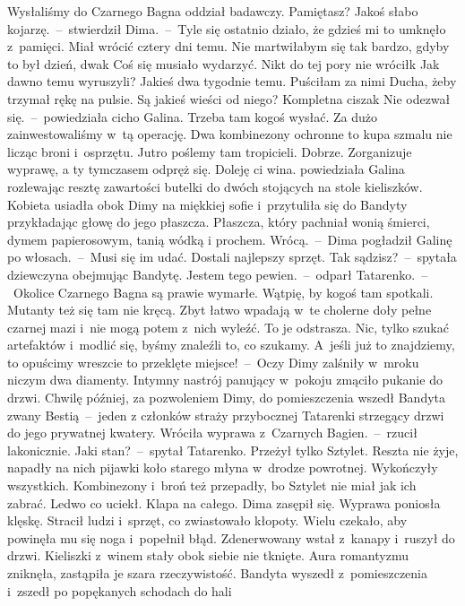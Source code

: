 \documentclass[../MAIN.tex]{subfiles}
\begin{document}
\xx  Wysłaliśmy do Czarnego Bagna oddział badawczy. Pamiętasz?
\xx  Jakoś słabo kojarzę.~--~stwierdził Dima.~--~Tyle się ostatnio działo, że
gdzieś mi to umknęło z~pamięci.
\xx  Miał wrócić cztery dni temu. Nie martwiłabym się tak bardzo, gdyby to był
dzień, dwa\3k Coś się musiało wydarzyć. Nikt do tej pory nie wrócił\3k
\xx  Jak dawno temu wyruszyli?
\xx  Jakieś dwa tygodnie temu. Puściłam za nimi Ducha, żeby trzymał rękę na
pulsie.
\xx  Są jakieś wieści od niego?
\xx  Kompletna cisza\3k Nie odezwał się.~--~powiedziała cicho Galina.
\xx  Trzeba tam kogoś wysłać. Za dużo zainwestowaliśmy w~tą operację. Dwa
kombinezony ochronne to kupa szmalu nie licząc broni i~osprzętu. Jutro poślemy
tam tropicieli.
\xx  Dobrze. Zorganizuje wyprawę, a ty tymczasem odpręż się. Doleję ci wina. \x
powiedziała Galina rozlewając resztę zawartości butelki do dwóch stojących na
stole kieliszków.
\qd \mm
Kobieta usiadła obok Dimy na miękkiej sofie i~przytuliła się do Bandyty
przykładając głowę do jego płaszcza. Płaszcza, który pachniał wonią śmierci, dymem papierosowym, tanią wódką i prochem.
\sx Wrócą.~--~Dima pogładził Galinę po włosach.~--~Musi się im udać. Dostali
najlepszy sprzęt.
\xx  Tak sądzisz?~--~spytała dziewczyna obejmując Bandytę.
\xx  Jestem tego pewien.~--~odparł Tatarenko.~--~Okolice Czarnego Bagna są prawie
wymarłe. Wątpię, by kogoś tam spotkali. Mutanty też się tam nie kręcą. Zbyt
łatwo wpadają w~te cholerne doły pełne czarnej mazi i~nie mogą potem z~nich
wyleźć. To je odstrasza. Nic, tylko szukać artefaktów i~modlić się, byśmy
znaleźli to, co szukamy. A~jeśli już to znajdziemy, to opuścimy wreszcie to
przeklęte miejsce!~--~Oczy Dimy zalśniły w~mroku niczym dwa diamenty.
\qm
Intymny nastrój panujący w~pokoju zmąciło pukanie do drzwi. Chwilę później, za
pozwoleniem Dimy, do pomieszczenia wszedł Bandyta zwany Bestią~--~jeden z
członków straży przybocznej Tatarenki strzegący drzwi do jego prywatnej kwatery.
\sx
Wróciła wyprawa z~Czarnych Bagien.~--~rzucił lakonicznie.
\xx  Jaki stan?~--~spytał Tatarenko.
\xx  Przeżył tylko Sztylet. Reszta nie żyje, napadły na nich pijawki koło starego
młyna w~drodze powrotnej. Wykończyły wszystkich. Kombinezony i~broń też
przepadły, bo Sztylet nie miał jak ich zabrać. Ledwo co uciekł. Klapa na całego.
\qm
Dima zasępił się. Wyprawa poniosła klęskę. Stracił ludzi i~sprzęt, co
zwiastowało kłopoty. Wielu czekało, aby powinęła mu się noga i~popełnił błąd.
Zdenerwowany wstał z~kanapy i~ruszył do drzwi. Kieliszki z~winem stały obok
siebie nie tknięte. Aura romantyzmu zniknęła, zastąpiła je szara rzeczywistość.
Bandyta wyszedł z~pomieszczenia i~zszedł po popękanych schodach do hali
\end{document}
